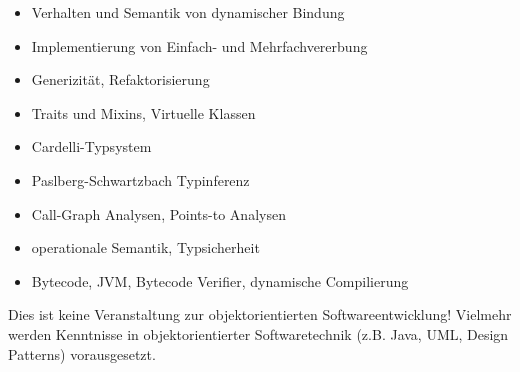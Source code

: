 \begin{module}
\begin{learningoutcomes}
\end{learningoutcomes}

\begin{content}
\begin{itemize}\item Verhalten und Semantik von dynamischer Bindung  \item Implementierung von Einfach- und Mehrfachvererbung  \item Generizität, Refaktorisierung  \item Traits und Mixins, Virtuelle Klassen  \item Cardelli-Typsystem  \item Paslberg-Schwartzbach Typinferenz  \item Call-Graph Analysen, Points-to Analysen  \item operationale Semantik, Typsicherheit  \item Bytecode, JVM, Bytecode Verifier, dynamische Compilierung  \end{itemize}
\end{content}

\begin{remarks}Dies ist keine Veranstaltung zur objektorientierten Softwareentwicklung! Vielmehr werden Kenntnisse in objektorientierter Softwaretechnik (z.B. Java, UML, Design Patterns) vorausgesetzt.

\end{remarks}

\end{module}

